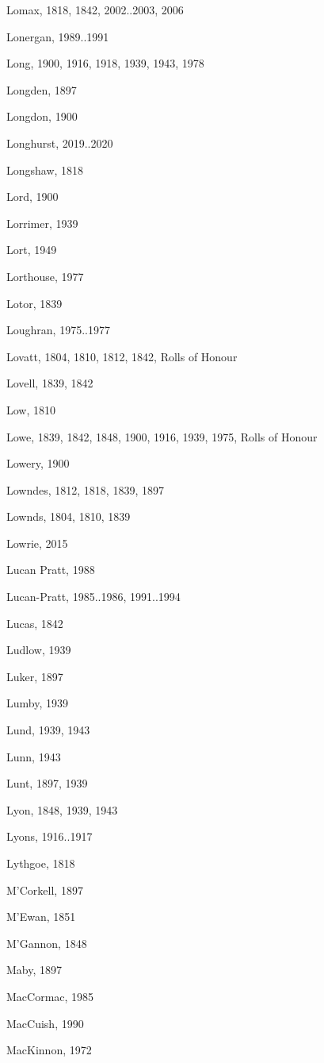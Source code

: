 {\begin{theindex}
\item Lomax, 1818, 1842, 2002..2003, 2006
\item Lonergan, 1989..1991
\item Long, 1900, 1916, 1918, 1939, 1943, 1978
\item Longden, 1897
\item Longdon, 1900
\item Longhurst, 2019..2020
\item Longshaw, 1818
\item Lord, 1900
\item Lorrimer, 1939
\item Lort, 1949
\item Lorthouse, 1977
\item Lotor, 1839
\item Loughran, 1975..1977
\item Lovatt, 1804, 1810, 1812, 1842, Rolls of Honour
\item Lovell, 1839, 1842
\item Low, 1810
\item Lowe, 1839, 1842, 1848, 1900, 1916, 1939, 1975, Rolls of Honour
\item Lowery, 1900
\item Lowndes, 1812, 1818, 1839, 1897
\item Lownds, 1804, 1810, 1839
\item Lowrie, 2015
\item Lucan Pratt, 1988
\item Lucan-Pratt, 1985..1986, 1991..1994
\item Lucas, 1842
\item Ludlow, 1939
\item Luker, 1897
\item Lumby, 1939
\item Lund, 1939, 1943
\item Lunn, 1943
\item Lunt, 1897, 1939
\item Lyon, 1848, 1939, 1943
\item Lyons, 1916..1917
\item Lythgoe, 1818
\item M'Corkell, 1897
\item M'Ewan, 1851
\item M'Gannon, 1848
\item Maby, 1897
\item MacCormac, 1985
\item MacCuish, 1990
\item MacKinnon, 1972

\end{theindex}}

